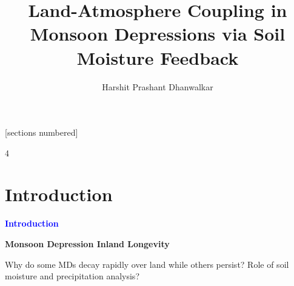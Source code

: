 \documentclass[8pt, aspectratio=169]{beamer}
\title{Land-Atmosphere Coupling in Monsoon Depressions via Soil Moisture Feedback}
\author{Harshit Prashant Dhanwalkar}
\date{}
\newcommand{\pdflink}[2]{\href{file:papers/#1.pdf}{#2}}
\begin{document}
\begin{frame}
    \titlepage
\end{frame}

\begin{frame}[plain, c]
    \vspace{-2cm}
    \setlength{\columnsep}{0.2em}
    \setcounter{tocdepth}{3} %

    [sections numbered]

    \begin{multicols}{4}
        \tableofcontents
    \end{multicols}
\end{frame}

\section{Introduction}
\begin{frame}
    \begin{center}
        \Huge \textcolor{blue}{\textbf{Introduction}} \\
    \end{center}
    \setcounter{framenumber}{0}
\end{frame}

\begin{frame}
    \begin{center}
        \Large
        \textbf{Monsoon Depression Inland Longevity}

        \vspace{1cm}
        \normalsize
        Why do some MDs decay rapidly over land while others persist? Role of soil moisture and precipitation analysis?

    \end{center}
\end{frame}
\end{document}
